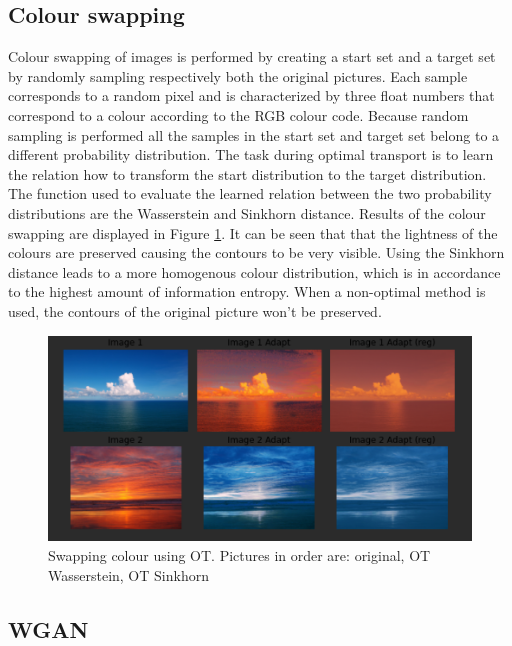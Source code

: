 \documentclass[a4paper,10pt]{article}
\begin{document}
\subsection{Colour swapping}
Colour swapping of images is performed by creating a start set and a target set by randomly sampling respectively both the original pictures. Each sample corresponds to a random pixel and is characterized by three float numbers that correspond to a colour according to the RGB colour code. Because random sampling is performed all the samples in the start set and target set belong to a different probability distribution. The task during optimal transport is to learn the relation how to transform the start distribution to the target distribution. The function used to evaluate the learned relation between the two probability distributions are the Wasserstein and Sinkhorn distance. Results of the colour swapping are displayed in Figure \ref{fig:switch colour}. It can be seen that that the lightness of the colours are preserved causing the contours to be very visible. Using the Sinkhorn distance leads to a more homogenous colour distribution, which is in accordance to the highest amount of information entropy. When a non-optimal method is used, the contours of the original picture won't be preserved. 

\begin{figure}[h]
	\centering
	\includegraphics[width=0.7\linewidth]{OT_pictures.png}
	\caption{Swapping colour using OT. Pictures in order are: original, OT Wasserstein, OT Sinkhorn}
	\label{fig:switch colour}
\end{figure}

\subsection{WGAN}
\end{document}
